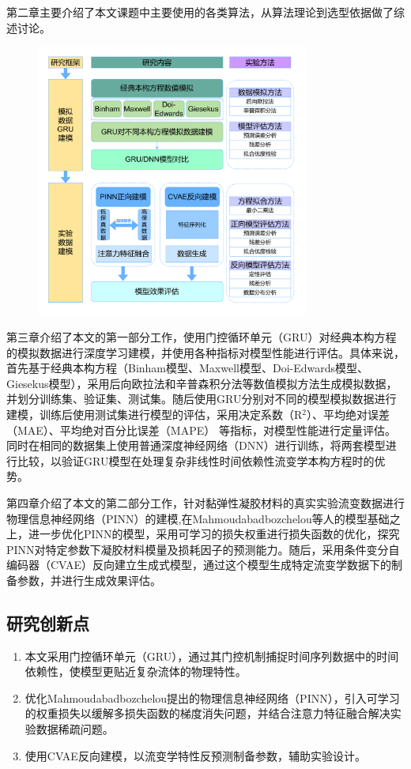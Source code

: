 第二章主要介绍了本文课题中主要使用的各类算法，从算法理论到选型依据做了综述讨论。
\begin{figure}[htbp]
	\centering
	\includegraphics[width=0.8\textwidth]{Fig/HolisticResearchFramework.drawio.pdf}
\end{figure}
第三章介绍了本文的第一部分工作，使用门控循环单元（GRU）对经典本构方程的模拟数据进行深度学习建模，并使用各种指标对模型性能进行评估。具体来说，首先基于经典本构方程（Binham模型、Maxwell模型、Doi-Edwards模型、Giesekus模型），采用后向欧拉法和辛普森积分法等数值模拟方法生成模拟数据，并划分训练集、验证集、测试集。随后使用GRU分别对不同的模型模拟数据进行建模，训练后使用测试集进行模型的评估，采用决定系数（R$^2$）、平均绝对误差（MAE）、平均绝对百分比误差（MAPE）
等指标，对模型性能进行定量评估。同时在相同的数据集上使用普通深度神经网络（DNN）进行训练，将两套模型进行比较，以验证GRU模型在处理复杂非线性时间依赖性流变学本构方程时的优势。

第四章介绍了本文的第二部分工作，针对黏弹性凝胶材料的真实实验流变数据进行物理信息神经网络（PINN）的建模,在Mahmoudabadbozchelou等人的模型基础之上，进一步优化PINN的模型，采用可学习的损失权重进行损失函数的优化，探究PINN对特定参数下凝胶材料模量及损耗因子的预测能力。随后，采用条件变分自编码器（CVAE）反向建立生成式模型，通过这个模型生成特定流变学数据下的制备参数，并进行生成效果评估。

\subsection{研究创新点}
\begin{enumerate}[topsep = 0 pt, itemsep= 0 pt, parsep=0pt, partopsep=0pt, leftmargin=44pt, itemindent=0pt, labelsep=6pt, label=(\arabic*)]
	\item 本文采用门控循环单元（GRU），通过其门控机制捕捉时间序列数据中的时间依赖性，使模型更贴近复杂流体的物理特性。
	\item 优化Mahmoudabadbozchelou提出的物理信息神经网络（PINN），引入可学习的权重损失以缓解多损失函数的梯度消失问题，并结合注意力特征融合解决实验数据稀疏问题。
	\item 使用CVAE反向建模，以流变学特性反预测制备参数，辅助实验设计。
\end{enumerate}
